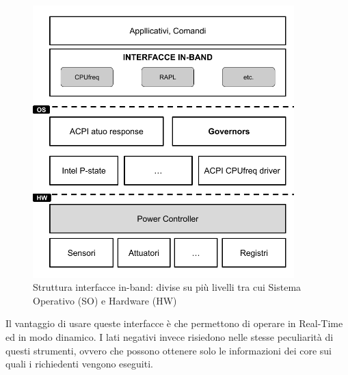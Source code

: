 \begin{figure}[H]
    \centering
    \includegraphics[width=0.9\textwidth]{img/in-band.png}
    \caption{Struttura interfacce in-band: divise su più livelli tra cui Sistema Operativo (SO) e Hardware (HW) } 
    \label{fig:inband}
\end{figure}

Il vantaggio di usare queste interfacce è che permettono di operare in \gls{Real-Time} ed in modo dinamico. I lati negativi invece risiedono nelle stesse peculiarità di questi strumenti, ovvero che possono ottenere solo le informazioni dei core sui quali i richiedenti vengono eseguiti. 



